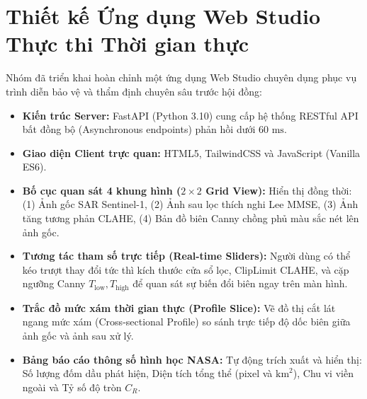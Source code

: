 \section{Thiết kế Ứng dụng Web Studio Thực thi Thời gian thực}
Nhóm đã triển khai hoàn chỉnh một ứng dụng Web Studio chuyên dụng phục vụ trình diễn bảo vệ và thẩm định chuyên sâu trước hội đồng:
\begin{itemize}
    \item \textbf{Kiến trúc Server:} FastAPI (Python 3.10) cung cấp hệ thống RESTful API bất đồng bộ (Asynchronous endpoints) phản hồi dưới $60\text{ ms}$.
    \item \textbf{Giao diện Client trực quan:} HTML5, TailwindCSS và JavaScript (Vanilla ES6).
    \item \textbf{Bố cục quan sát 4 khung hình ($2 \times 2$ Grid View):} Hiển thị đồng thời: (1) Ảnh gốc SAR Sentinel-1, (2) Ảnh sau lọc thích nghi Lee MMSE, (3) Ảnh tăng tương phản CLAHE, (4) Bản đồ biên Canny chồng phủ màu sắc nét lên ảnh gốc.
    \item \textbf{Tương tác tham số trực tiếp (Real-time Sliders):} Người dùng có thể kéo trượt thay đổi tức thì kích thước cửa sổ lọc, ClipLimit CLAHE, và cặp ngưỡng Canny $T_{\text{low}}, T_{\text{high}}$ để quan sát sự biến đổi biên ngay trên màn hình.
    \item \textbf{Trắc đồ mức xám thời gian thực (Profile Slice):} Vẽ đồ thị cắt lát ngang mức xám (Cross-sectional Profile) so sánh trực tiếp độ dốc biên giữa ảnh gốc và ảnh sau xử lý.
    \item \textbf{Bảng báo cáo thông số hình học NASA:} Tự động trích xuất và hiển thị: Số lượng đốm dầu phát hiện, Diện tích tổng thể (pixel và $\text{km}^2$), Chu vi viền ngoài và Tỷ số độ tròn $C_R$.
\end{itemize}
